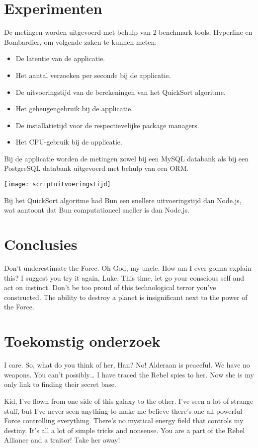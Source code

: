 \documentclass[a0,portrait]{hogent-poster}
\begin{document}
\begin{multicols}{2}
\section{Experimenten}

De metingen worden uitgevoerd met behulp van 2 benchmark tools, Hyperfine en Bombardier, om volgende zaken te kunnen meten:
\begin{itemize}
    \item De latentie van de applicatie.
    \item Het aantal verzoeken per seconde bij de applicatie.
    \item De uitvoeringstijd van de berekeningen van het QuickSort algoritme.
    \item Het geheugengebruik bij de applicatie.
    \item De installatietijd voor de respectievelijke package managers.
    \item Het CPU-gebruik bij de applicatie.
\end{itemize}
Bij de applicatie worden de metingen zowel bij een MySQL databank als bij een PostgreSQL databank uitgevoerd met behulp van een ORM.
\begin{center}
  \captionsetup{type=figure}
  \texttt{[image: scriptuitvoeringstijd]}
\end{center}
Bij het QuickSort algoritme had Bun een snellere uitvoeringstijd dan Node.js, wat aantoont dat Bun computationeel sneller is dan Node.js.


\section{Conclusies}

Don't underestimate the Force. Oh God, my uncle. How am I ever gonna explain this? I suggest you try it again, Luke. This time, let go your conscious self and act on instinct. Don't be too proud of this technological terror you've constructed. The ability to destroy a planet is insignificant next to the power of the Force.

\section{Toekomstig onderzoek}

I care. So, what do you think of her, Han? No! Alderaan is peaceful. We have no weapons. You can't possibly… I have traced the Rebel spies to her. Now she is my only link to finding their secret base.

Kid, I've flown from one side of this galaxy to the other. I've seen a lot of strange stuff, but I've never seen anything to make me believe there's one all-powerful Force controlling everything. There's no mystical energy field that controls my destiny. It's all a lot of simple tricks and nonsense. You are a part of the Rebel Alliance and a traitor! Take her away! 

\end{multicols}
\end{document}
